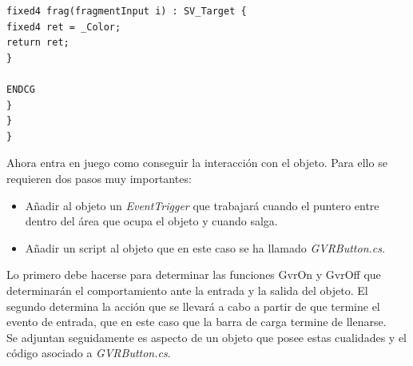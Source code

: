 \begin{lstlisting}[frame=single, caption={GvrReticleShader.shader}]
fixed4 frag(fragmentInput i) : SV_Target {
fixed4 ret = _Color;
return ret;
}

ENDCG
}
}
}

\end{lstlisting}


\quad Ahora entra en juego como conseguir la interacción con el objeto. Para ello se requieren dos pasos muy importantes: \\

\begin{itemize}
	\item Añadir al objeto un \textit{EventTrigger} que trabajará cuando el puntero entre dentro del área que ocupa el objeto y cuando salga.
	\item Añadir un script al objeto que en este caso se ha llamado \textit{GVRButton.cs}.
\end{itemize}
\FloatBarrier

\quad Lo primero debe hacerse para determinar las funciones GvrOn y GvrOff que determinarán el comportamiento ante la entrada y la salida del objeto. El segundo determina la acción que se llevará a cabo a partir de que termine el evento de entrada, que en este caso que la barra de carga termine de llenarse.\\

\quad Se adjuntan seguidamente es aspecto de un objeto que posee estas cualidades y el código asociado a \textit{GVRButton.cs}.\\

